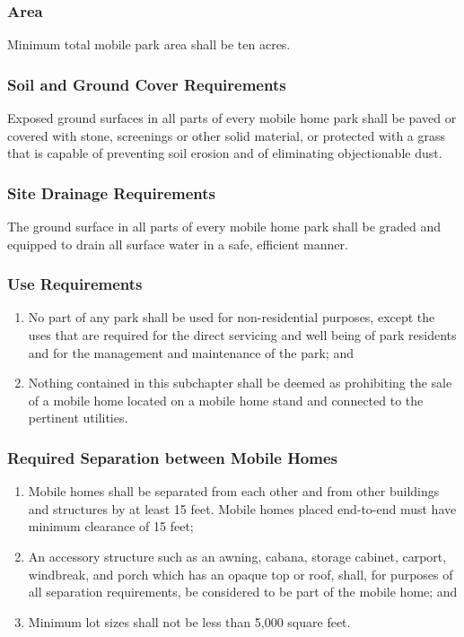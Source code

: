 \subsubsection{Area}
Minimum total mobile park area shall be ten acres.
\subsubsection{Soil and Ground Cover Requirements}
Exposed ground surfaces in all parts of every mobile home park shall be paved or covered with stone, screenings or other solid material, or protected with a grass that is capable of preventing soil erosion and of eliminating objectionable dust.
\subsubsection{Site Drainage Requirements}
The ground surface in all parts of every mobile home park shall be graded and equipped to drain all surface water in a safe, efficient manner.
\subsubsection{Use Requirements}
\begin{enumerate}[{\indent}a)]
    \item No part of any park shall be used for non-residential purposes, except the uses that are required for the direct servicing and well being of park residents and for the management and maintenance of the park; and 
    \item Nothing contained in this subchapter shall be deemed as prohibiting the sale of a mobile home located on a mobile home stand and connected to the pertinent utilities.
\end{enumerate}
\subsubsection{Required Separation between Mobile Homes}
\begin{enumerate}[{\indent}a)]
    \item Mobile homes shall be separated from each other and from other buildings and structures by at least 15 feet. Mobile homes placed end-to-end must have minimum clearance of 15 feet; 
    \item An accessory structure such as an awning, cabana, storage cabinet, carport, windbreak, and porch which has an opaque top or roof, shall, for purposes of all separation requirements, be considered to be part of the mobile home; and 
    \item Minimum lot sizes shall not be less than 5,000 square feet.
\end{enumerate}
